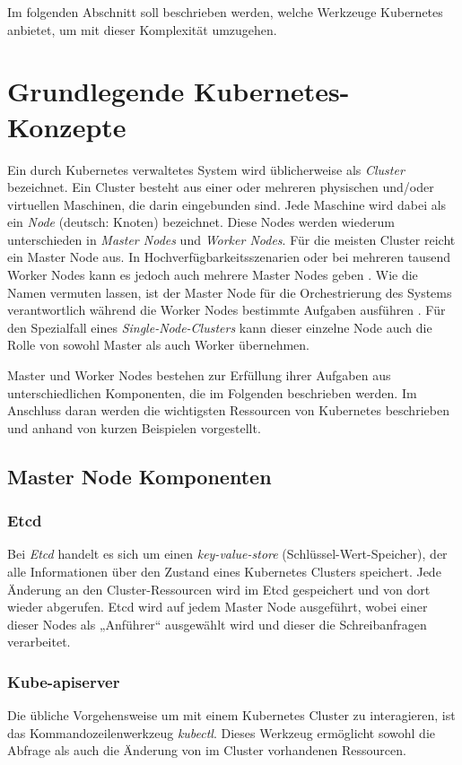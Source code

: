 \documentclass[11pt,a4paper]{article}
\begin{document}
Im folgenden Abschnitt soll beschrieben werden, welche Werkzeuge Kubernetes anbietet, um mit dieser Komplexität umzugehen.

\section{Grundlegende Kubernetes-Konzepte}
\label{sec:Grundlegende_Kubernetes-Konzepte}
Ein durch Kubernetes verwaltetes System wird üblicherweise als \emph{Cluster} bezeichnet.
Ein Cluster besteht aus einer oder mehreren physischen und/oder virtuellen Maschinen, die darin eingebunden sind.
Jede Maschine wird dabei als ein \emph{Node} (deutsch: Knoten) bezeichnet. Diese Nodes werden wiederum unterschieden in
\emph{Master Nodes} und \emph{Worker Nodes}.
Für die meisten Cluster reicht ein Master Node aus. In Hochverfügbarkeitsszenarien oder bei mehreren
tausend Worker Nodes kann es jedoch auch mehrere Master Nodes geben \cite{Schmeling_Dargatz_2022}.
Wie die Namen vermuten lassen, ist der Master Node für die Orchestrierung
des Systems verantwortlich während die Worker Nodes bestimmte Aufgaben ausführen \cite{Bentaleb_Belloum_Sebaa_El-Maouhab_2021}.
Für den Spezialfall eines \emph{Single-Node-Clusters} kann dieser einzelne Node auch die Rolle von sowohl
Master als auch Worker übernehmen.

Master und Worker Nodes bestehen zur Erfüllung ihrer Aufgaben aus unterschiedlichen Komponenten,
die im Folgenden beschrieben werden. Im Anschluss daran werden die wichtigsten Ressourcen
von Kubernetes beschrieben und anhand von kurzen Beispielen vorgestellt.

\subsection{Master Node Komponenten}
\subsubsection{Etcd}
\label{Etcd}
Bei \emph{Etcd} handelt es sich um einen \emph{key-value-store} (Schlüssel-Wert-Speicher),
der alle Informationen über den Zustand eines Kubernetes Clusters speichert.
Jede Änderung an den Cluster-Ressourcen wird im Etcd gespeichert und von dort wieder abgerufen.
Etcd wird auf jedem Master Node ausgeführt, wobei einer dieser Nodes als „Anführer“
ausgewählt wird und dieser die Schreibanfragen verarbeitet.

\subsubsection{Kube-apiserver}
\label{sec:Kube-apiverver}
Die übliche Vorgehensweise um mit einem Kubernetes Cluster zu interagieren, ist das Kommandozeilenwerkzeug \emph{kubectl}.
Dieses Werkzeug ermöglicht sowohl die Abfrage als auch die Änderung von im Cluster vorhandenen Ressourcen.
\end{document}
